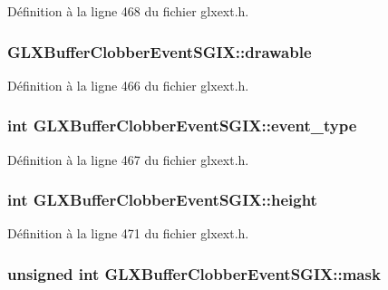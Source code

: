 Définition à la ligne 468 du fichier glxext.\-h.

\hypertarget{struct_g_l_x_buffer_clobber_event_s_g_i_x_a9c45674193ed80a79261c3b7518ee04f}{
\subsubsection[{drawable}]{ G\-L\-X\-Buffer\-Clobber\-Event\-S\-G\-I\-X\-::drawable}}\label{struct_g_l_x_buffer_clobber_event_s_g_i_x_a9c45674193ed80a79261c3b7518ee04f}


Définition à la ligne 466 du fichier glxext.\-h.

\hypertarget{struct_g_l_x_buffer_clobber_event_s_g_i_x_a0b405123f1d6528f1f4dfa7ff92bde9b}{
\subsubsection[{event\-\_\-type}]{\setlength{\rightskip}{0pt plus 5cm}int G\-L\-X\-Buffer\-Clobber\-Event\-S\-G\-I\-X\-::event\-\_\-type}}\label{struct_g_l_x_buffer_clobber_event_s_g_i_x_a0b405123f1d6528f1f4dfa7ff92bde9b}


Définition à la ligne 467 du fichier glxext.\-h.

\hypertarget{struct_g_l_x_buffer_clobber_event_s_g_i_x_a7838dbabb76c22aa8241310a3f2363ea}{
\subsubsection[{height}]{\setlength{\rightskip}{0pt plus 5cm}int G\-L\-X\-Buffer\-Clobber\-Event\-S\-G\-I\-X\-::height}}\label{struct_g_l_x_buffer_clobber_event_s_g_i_x_a7838dbabb76c22aa8241310a3f2363ea}


Définition à la ligne 471 du fichier glxext.\-h.

\hypertarget{struct_g_l_x_buffer_clobber_event_s_g_i_x_a74b4ad1ad3cac011001151411f621da1}{
\subsubsection[{mask}]{\setlength{\rightskip}{0pt plus 5cm}unsigned int G\-L\-X\-Buffer\-Clobber\-Event\-S\-G\-I\-X\-::mask}}\label{struct_g_l_x_buffer_clobber_event_s_g_i_x_a74b4ad1ad3cac011001151411f621da1}


